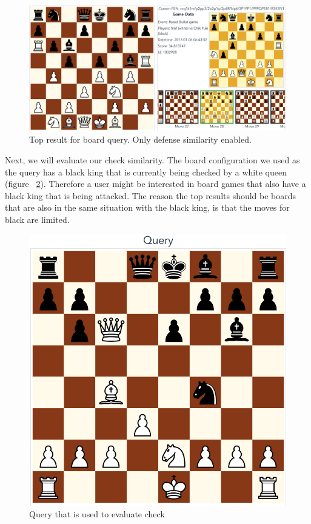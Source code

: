 \documentclass[11pt]{article}
\begin{document}
    \begin{figure}[H]
        \centering
        \includegraphics[width=14cm]{images/Defense}
        \caption{Top result for board query. Only defense similarity enabled.}
        \label{fig:Defense}
    \end{figure}

    Next, we will evaluate our check similarity. The board configuration we used as the query has a black king that is currently being checked by a white queen (figure ~\ref{fig:BlackCheckQuery}). Therefore a user might be interested in board games that also have a black king that is being attacked. The reason the top results should be boards that are also in the same situation with the black king, is that the moves for black are limited.

    \begin{figure}[H]
        \centering
        \includegraphics[width=14cm]{images/QueryBlackCheck}
        \caption{Query that is used to evaluate check}
        \label{fig:BlackCheckQuery}
    \end{figure}
\end{document}
